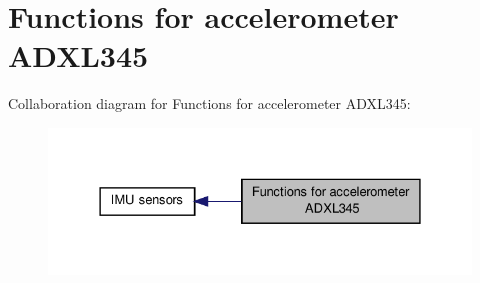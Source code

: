 \hypertarget{group__acc}{\section{Functions for accelerometer A\-D\-X\-L345}
\label{group__acc}
}
Collaboration diagram for Functions for accelerometer A\-D\-X\-L345\-:\nopagebreak
\begin{figure}[H]
\begin{center}
\leavevmode
\includegraphics[width=328pt]{group__acc}
\end{center}
\end{figure}
